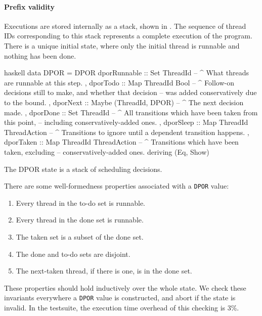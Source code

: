 \paragraph{Prefix validity}
Executions are stored internally as a stack, shown in .
The sequence of thread IDs corresponding to this stack represents a
complete execution of the program.  There is a unique initial state,
where only the initial thread is runnable and nothing has been done.

\begin{listing}
\centering
\begin{cminted}{haskell}
data DPOR = DPOR
  { dporRunnable :: Set ThreadId
  -- ^ What threads are runnable at this step.
  , dporTodo     :: Map ThreadId Bool
  -- ^ Follow-on decisions still to make, and whether that decision
  -- was added conservatively due to the bound.
  , dporNext     :: Maybe (ThreadId, DPOR)
  -- ^ The next decision made.
  , dporDone     :: Set ThreadId
  -- ^ All transitions which have been taken from this point,
  -- including conservatively-added ones.
  , dporSleep    :: Map ThreadId ThreadAction
  -- ^ Transitions to ignore until a dependent transition happens.
  , dporTaken    :: Map ThreadId ThreadAction
  -- ^ Transitions which have been taken, excluding
  -- conservatively-added ones.
  } deriving (Eq, Show)
\end{cminted}
\caption{The DPOR state is a stack of scheduling decisions.}\label{lst:dpor}
\end{listing}

There are some well-formedness properties associated with a
\verb|DPOR| value:

\begin{enumerate}
\item Every thread in the to-do set is runnable.
\item Every thread in the done set is runnable.
\item The taken set is a subset of the done set.
\item The done and to-do sets are disjoint.
\item The next-taken thread, if there is one, is in the done set.
\end{enumerate}

These properties should hold inductively over the whole state.  We
check these invariants everywhere a \verb|DPOR| value is constructed,
and abort if the state is invalid.  In the \dejafu{} testsuite, the
execution time overhead of this checking is 3\%.

